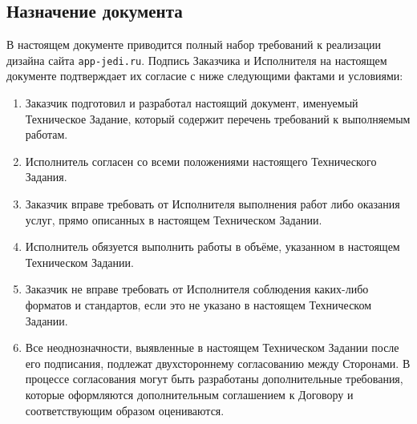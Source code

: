 \subsection{Назначение документа}
В настоящем документе приводится полный набор требований к реализации дизайна сайта \texttt{app-jedi.ru}.
Подпись Заказчика и Исполнителя на настоящем документе подтверждает их согласие с ниже следующими фактами и условиями:
\begin{enumerate}
  \item Заказчик подготовил и разработал настоящий документ, именуемый Техническое Задание, который содержит перечень требований к выполняемым работам.
  \item Исполнитель согласен со всеми положениями настоящего Технического Задания.
  \item Заказчик вправе требовать от Исполнителя выполнения работ либо оказания услуг, прямо описанных в настоящем Техническом Задании.
  \item Исполнитель обязуется выполнить работы в объёме, указанном в настоящем Техническом Задании.
  \item Заказчик не вправе требовать от Исполнителя соблюдения каких-либо форматов и стандартов, если это не указано в настоящем Техническом Задании.
  \item Все неоднозначности, выявленные в настоящем Техническом Задании после его подписания, подлежат двухстороннему согласованию между Сторонами. В процессе согласования могут быть разработаны дополнительные требования, которые оформляются дополнительным соглашением к Договору и соответствующим образом оцениваются.
\end{enumerate}
